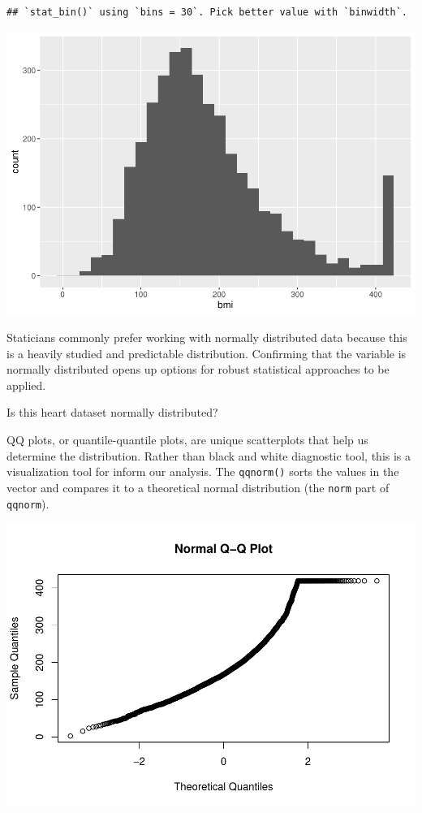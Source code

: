 \documentclass[
]{book}
\newenvironment{Shaded}{\begin{snugshade}}{\end{snugshade}}
\newcommand{\FunctionTok}[1]{\textcolor[rgb]{0.13,0.29,0.53}{\textbf{#1}}}
\newcommand{\NormalTok}[1]{#1}
\newcommand{\SpecialCharTok}[1]{\textcolor[rgb]{0.81,0.36,0.00}{\textbf{#1}}}
\begin{document}
\begin{verbatim}
## `stat_bin()` using `bins = 30`. Pick better value with `binwidth`.
\end{verbatim}

\includegraphics{_main_files/figure-latex/unnamed-chunk-95-1.pdf}

Staticians commonly prefer working with normally distributed data because this is a heavily studied and predictable distribution. Confirming that the variable is normally distributed opens up options for robust statistical approaches to be applied.

Is this heart dataset normally distributed?

QQ plots, or quantile-quantile plots, are unique scatterplots that help us determine the distribution. Rather than black and white diagnostic tool, this is a visualization tool for inform our analysis. The \texttt{qqnorm()} sorts the values in the vector and compares it to a theoretical normal distribution (the \texttt{norm} part of \texttt{qqnorm}).

\begin{Shaded}
\end{Shaded}

\includegraphics{_main_files/figure-latex/unnamed-chunk-96-1.pdf}
\end{document}
